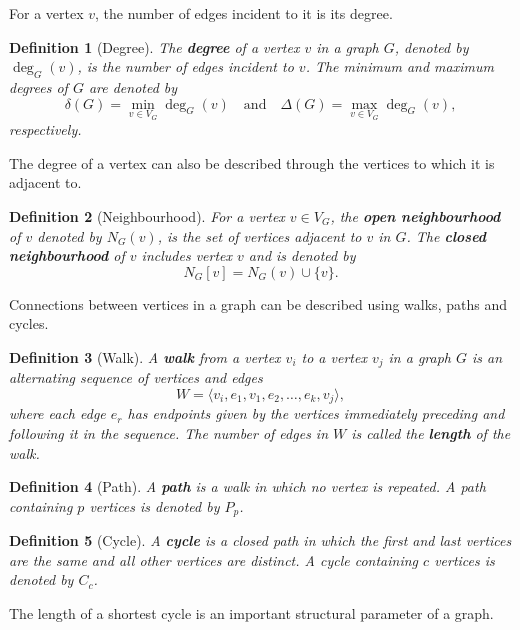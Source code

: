 \documentclass[11pt]{report}
\newtheorem{definition}{Definition}[section]
\begin{document}
For a vertex $v$, the number of edges incident to it is its degree.

\begin{definition}[Degree] \label{def::degree}
  The \textbf{degree} of a vertex $v$ in a graph $G$, denoted by $\deg_G(v)$, is the number of edges incident to $v$. The minimum and maximum degrees of $G$ are denoted by
  \[
  \delta(G)=\min_{v\in V_G}\deg_G(v) \quad \text{and} \quad \Delta(G)=\max_{v\in V_G}\deg_G(v),
  \]
  respectively.
\end{definition}

The degree of a vertex can also be described through the vertices to which it is adjacent to.

\begin{definition}[Neighbourhood] \label{def::neighbourhood}
  For a vertex $v\in V_G$, the \textbf{open neighbourhood} of $v$ denoted by $N_G(v)$, is the set of vertices adjacent to $v$ in $G$. The \textbf{closed neighbourhood} of $v$ includes vertex $v$ and is denoted by 
  \[
  N_G[v]=N_G(v)\cup\{v\}.
  \]
\end{definition}

Connections between vertices in a graph can be described using walks, paths and cycles.

\begin{definition}[Walk] \label{def::walk}
  A \textbf{walk} from a vertex $v_i$ to a vertex $v_j$ in a graph $G$ is an alternating sequence of vertices and edges
  \[
  W=\langle v_i,e_1,v_1,e_2,\ldots,e_k,v_j\rangle,
  \]
  where each edge $e_r$ has endpoints given by the vertices immediately preceding and following it in the sequence. The number of edges in $W$ is called the \textbf{length} of the walk.
\end{definition}

\begin{definition}[Path] \label{def::path}
  A \textbf{path} is a walk in which no vertex is repeated. A path containing $p$ vertices is denoted by $P_p$. 
\end{definition}

\begin{definition}[Cycle] \label{def::cycle}
  A \textbf{cycle} is a closed path in which the first and last vertices are the same and all other vertices are distinct. A cycle containing $c$ vertices is denoted by $C_c$. 
\end{definition}

The length of a shortest cycle is an important structural parameter of a graph.
\end{document}
